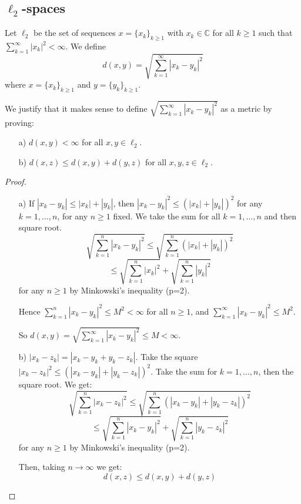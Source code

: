 \subsection{$\ell_2$-spaces}
\begin{definition}
    Let $\ell_2$ be the set of sequences $x=\{x_k\}_{k\geq 1}$ with $x_k \in \mathbb{C}$ for all $k \geq 1$ such that $\sum_{k=1}^{\infty} |x_k|^2 < \infty$. We define
\[ d(x,y) = \sqrt{\sum_{k=1}^{\infty} |x_k - y_k|^2} \]
where $x=\{x_k\}_{k\geq 1}$ and $y=\{y_k\}_{k\geq 1}$.
\end{definition}


\begin{lemma}
We justify that it makes sense to define $\sqrt{\sum_{k=1}^{\infty} |x_k - y_k|^2}$ as a metric  by proving:
 \begin{enumerate}
    \item[a)] $d(x,y) < \infty$ for all $x,y \in \ell_2$.
    \item[b)] $d(x,z) \leq d(x,y) + d(y,z)$ for all $x,y,z \in \ell_2$.
\end{enumerate}
\end{lemma}

\begin{proof}
\begin{enumerate}
    \item[a)] If $|x_k - y_k| \leq |x_k| + |y_k|$, then $|x_k - y_k|^2 \leq (|x_k| + |y_k|)^2$ for any $k=1,\ldots,n$, for any $n \geq 1$ fixed. We take the sum for all $k=1,\ldots,n$ and then square root.
    \[ \sqrt{\sum_{k=1}^{n} |x_k - y_k|^2} \leq \sqrt{\sum_{k=1}^{n} (|x_k| + |y_k|)^2} \]
    \[ \leq \sqrt{\sum_{k=1}^{n} |x_k|^2} + \sqrt{\sum_{k=1}^{n} |y_k|^2} \]
    for any $n \geq 1$ by Minkowski's inequality (p=2).
    
    Hence $\sum_{k=1}^{n} |x_k - y_k|^2 \leq M^2 < \infty$ for all $n\geq 1$, and $\sum_{k=1}^{\infty} |x_k - y_k|^2 \leq M^2$.
    
    So $d(x,y) = \sqrt{\sum_{k=1}^{\infty} |x_k - y_k|^2} \leq M < \infty$.

    \item[b)] $|x_k - z_k| = |x_k - y_k + y_k - z_k|$. Take the square $|x_k - z_k|^2 \leq (|x_k - y_k| + |y_k - z_k|)^2$. Take the sum for $k=1,\ldots,n$, then the square root. We get:
    \[ \sqrt{\sum_{k=1}^{n} |x_k - z_k|^2} \leq \sqrt{\sum_{k=1}^{n} (|x_k - y_k| + |y_k - z_k|)^2} \]
    \[ \leq \sqrt{\sum_{k=1}^{n} |x_k - y_k|^2} + \sqrt{\sum_{k=1}^{n} |y_k - z_k|^2} \]
    for any $n \geq 1$ by Minkowski's inequality (p=2).
    
    Then, taking $n \to \infty$ we get:
    \[ d(x,z) \leq d(x,y) + d(y,z) \]
\end{enumerate}
\end{proof}

